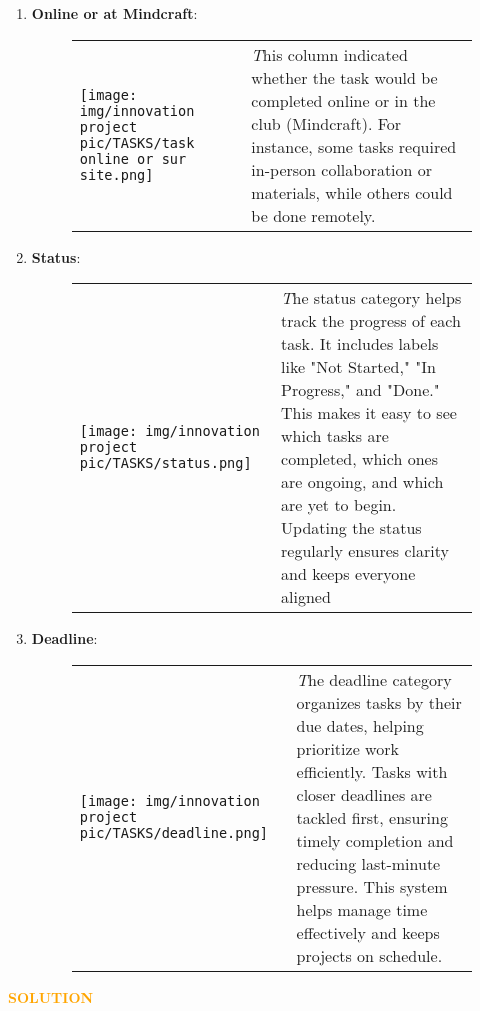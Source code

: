 \begin{enumerate}
    \item \textbf{Online or at Mindcraft}:
\begin{figure}[H]
   
    \begin{tabular}{m{} m{}}
        \texttt{[image: img/innovation project pic/TASKS/task online or sur site.png]} & 
        \textit This column indicated whether the task would be completed online or in the club (Mindcraft). For instance, some tasks required in-person collaboration or materials, while others could be done remotely.
    \end{tabular}
\end{figure}
\newpage

    \item \textbf{Status}:
\begin{figure}[H]
   
    \begin{tabular}{m{} m{}}
        \texttt{[image: img/innovation project pic/TASKS/status.png]} & 
        \textit The status category helps track the progress of each task. It includes labels like "Not Started," "In Progress," and "Done." This makes it easy to see which tasks are completed, which ones are ongoing, and which are yet to begin. Updating the status regularly ensures clarity and keeps everyone aligned
    \end{tabular}
\end{figure}

    \item \textbf{Deadline}:
\begin{figure}[H]
   
    \begin{tabular}{m{} m{}}
        \texttt{[image: img/innovation project pic/TASKS/deadline.png]} & 
        \textit The deadline category organizes tasks by their due dates, helping prioritize work efficiently. Tasks with closer deadlines are tackled first, ensuring timely completion and reducing last-minute pressure. This system helps manage time effectively and keeps projects on schedule.
    \end{tabular}
\end{figure}

\end{enumerate}

\newpage
\begin{center}
    \huge \textbf{\textcolor{orange}{SOLUTION }} \\[0.5cm]
 
\end{center}
